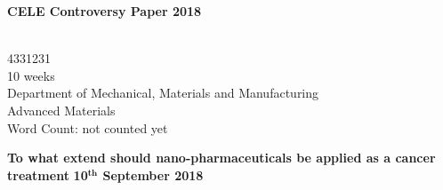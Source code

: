 \documentclass[10pt]{article}
\makeatletter
\def\wordcount#1{\gdef\@wordcount{#1}}
\makeatother
\begin{document}
\author{Zimou Feng}%
\wordcount{not counted yet} %
\begin{titlepage}
\begin{center}
\large {\bf CELE Controversy Paper 2018}
\end{center}
\vskip 0.3in
\textbf{{\@author}}
\\ 4331231 %
\\ 10 weeks
\\ Department of Mechanical, Materials and Manufacturing %
\\ Advanced Materials %
\\ Word Count: {\@wordcount}
\vskip 1.5in  
\begin{center}
\Large {\bf To what extend should  nano-pharmaceuticals be applied as a cancer treatment}%
\vskip 1in
\large {\bf 10$\mathbf {^{th}}$ September 2018}
\end{center}
\end{titlepage}

\raggedright

\tableofcontents\thispagestyle{empty}
\newpage\setcounter{page}{1}
\raggedright





\newpage
{}


\end{document}
